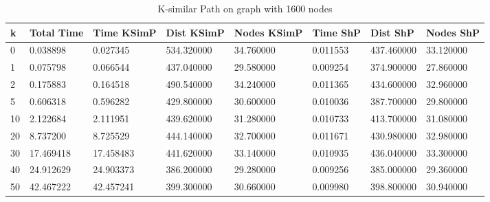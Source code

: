 \documentclass[]{article}
\numberwithin{equation}{section}
\begin{document}
\begin{appendices}
\begin{table}[H]
	\centering
	\small
	\setlength\tabcolsep{2pt}
	\begin{tabular}{|l|l|l|l|l|l|l|l|}
		\hline
		k  & Total Time & Time KSimP & Dist KSimP & Nodes KSimP & Time ShP & Dist ShP   & Nodes ShP \\ \hline
		0  & 0.038898   & 0.027345   & 534.320000 & 34.760000   & 0.011553 & 437.460000 & 33.120000 \\ \hline
		1  & 0.075798   & 0.066544   & 437.040000 & 29.580000   & 0.009254 & 374.900000 & 27.860000 \\ \hline
		2  & 0.175883   & 0.164518   & 490.540000 & 34.240000   & 0.011365 & 434.600000 & 32.960000 \\ \hline
		5  & 0.606318   & 0.596282   & 429.800000 & 30.600000   & 0.010036 & 387.700000 & 29.800000 \\ \hline
		10 & 2.122684   & 2.111951   & 439.620000 & 31.280000   & 0.010733 & 413.700000 & 31.080000 \\ \hline
		20 & 8.737200   & 8.725529   & 444.140000 & 32.700000   & 0.011671 & 430.980000 & 32.980000 \\ \hline
		30 & 17.469418  & 17.458483  & 441.620000 & 33.140000   & 0.010935 & 436.040000 & 33.300000 \\ \hline
		40 & 24.912629  & 24.903373  & 386.200000 & 29.280000   & 0.009256 & 385.000000 & 29.360000 \\ \hline
		50 & 42.467222  & 42.457241  & 399.300000 & 30.660000   & 0.009980 & 398.800000 & 30.940000 \\ \hline
	\end{tabular}
	\caption{K-similar Path on graph with 1600 nodes}
\end{table}


\end{appendices}
\end{document}
